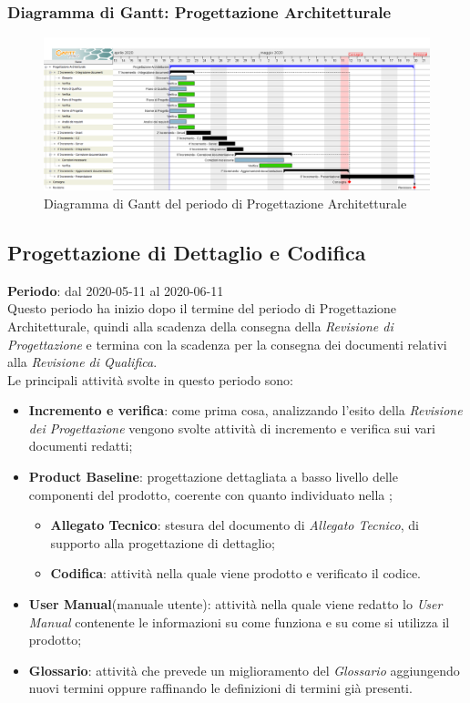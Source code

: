 	\subsubsection{Diagramma di Gantt: Progettazione Architetturale}
		\begin{figure}[h]
			\centering
			\includegraphics[width=1.1\textwidth]{./res/img/DiagrammiGantt/prog_arch_gantt.png}
			\caption{Diagramma di Gantt del periodo di Progettazione Architetturale}
		\end{figure}
\newpage
\subsection{Progettazione di Dettaglio e Codifica}
\textbf{Periodo}: dal 2020-05-11 al 2020-06-11 \\
Questo periodo ha inizio dopo il termine del periodo di Progettazione Architetturale, quindi alla scadenza della consegna della \textit{Revisione di Progettazione} e termina con la scadenza per la consegna dei documenti relativi alla \textit{Revisione di Qualifica}. \\
Le principali attività svolte in questo periodo sono:
\begin{itemize}
	\item \textbf{Incremento e verifica}: come prima cosa, analizzando l'esito della \textit{Revisione dei Progettazione} vengono svolte attività di incremento e verifica sui vari documenti redatti;
	\item \textbf{Product Baseline}: progettazione dettagliata a basso livello delle componenti del prodotto, coerente con quanto individuato nella \TB{};
	\begin{itemize}
		\item \textbf{Allegato Tecnico}: stesura del documento di \textit{Allegato Tecnico}, di supporto alla progettazione di dettaglio;
		\item \textbf{Codifica}: attività nella quale viene prodotto e verificato il codice.
	\end{itemize}
	\item \textbf{User Manual}(manuale utente): attività nella quale viene redatto lo \textit{User Manual} contenente le informazioni su come funziona e su come si utilizza il prodotto;
	\item \textbf{Glossario}: attività che prevede un miglioramento del \textit{Glossario} aggiungendo nuovi termini oppure raffinando le definizioni di termini già presenti.
\end{itemize}
